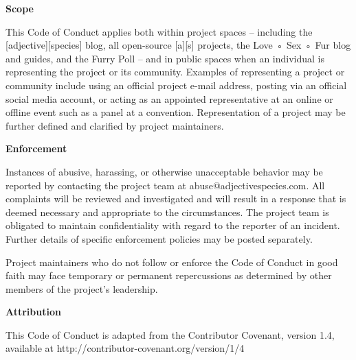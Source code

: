 \bigskip

\textbf{Scope}

This Code of Conduct applies both within project spaces – including the [adjective][species] blog, all open-source [a][s] projects, the Love ◦ Sex ◦ Fur blog and guides, and the Furry Poll – and in public spaces when an individual is representing the project or its community. Examples of representing a project or community include using an official project e-mail address, posting via an official social media account, or acting as an appointed representative at an online or offline event such as a panel at a convention. Representation of a project may be further defined and clarified by project maintainers.

\bigskip

\textbf{Enforcement}

Instances of abusive, harassing, or otherwise unacceptable behavior may be reported by contacting the project team at abuse@adjectivespecies.com. All complaints will be reviewed and investigated and will result in a response that is deemed necessary and appropriate to the circumstances. The project team is obligated to maintain confidentiality with regard to the reporter of an incident. Further details of specific enforcement policies may be posted separately.

Project maintainers who do not follow or enforce the Code of Conduct in good faith may face temporary or permanent repercussions as determined by other members of the project’s leadership.

\bigskip

\textbf{Attribution}

This Code of Conduct is adapted from the Contributor Covenant, version 1.4, available at http://contributor-covenant.org/version/1/4
